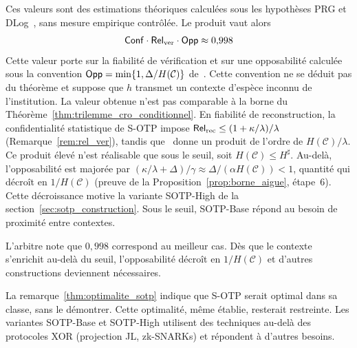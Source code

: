 \begin{sloppypar}
Ces valeurs sont des estimations th\'eoriques calcul\'ees sous les hypoth\`eses
PRG et DLog~\cite{Goldreich01,KatzLindell14}, sans mesure empirique
contr\^ol\'ee. Le produit vaut alors
\begin{equation}
\mathsf{Conf} \cdot \mathsf{Rel}_{\mathrm{ver}} \cdot \mathsf{Opp} \approx 0{,}998
\label{eq:sotp_produit}
\end{equation}
Cette valeur porte sur la fiabilit\'e de v\'erification et sur une
opposabilit\'e calcul\'ee sous la convention $\mathsf{Opp} = \min\{1,\Delta/H(\mathcal{C})\}$
de~\cite{MINKA2026CLO}. Cette convention ne se d\'eduit pas du th\'eor\`eme et suppose que $h$
transmet un contexte d'esp\`ece inconnu de l'institution. La valeur obtenue
n'est pas comparable \`a la borne du
Th\'eor\`eme~\ref{thm:trilemme_cro_conditionnel}. En fiabilit\'e de
reconstruction, la confidentialit\'e statistique de S-OTP impose
$\mathsf{Rel}_{\mathrm{rec}} \leq (1+\kappa/\lambda)/\lambda$ (Remarque~\ref{rem:rel_ver}),
tandis que~\cite{MINKA2026CLO} donne un produit de l'ordre de $H(\mathcal{C})/\lambda$.
Ce produit \'elev\'e n'est r\'ealisable que sous le seuil, soit $H(\mathcal{C}) \leq H^\sharp$.
Au-del\`a, l'opposabilit\'e
est major\'ee par $(\kappa/\lambda + \Delta)/\gamma \approx \Delta/(\alpha H(\mathcal{C})) < 1$, quantit\'e qui d\'ecro\^it en $1/H(\mathcal{C})$
(preuve de la Proposition~\ref{prop:borne_aigue}, \'etape~6). Cette d\'ecroissance motive
la variante SOTP-High de la section~\ref{sec:sotp_construction}. Sous le seuil, SOTP-Base r\'epond
au besoin de proximit\'e entre contextes.

\begin{boiteArbitre}
L'arbitre note que $0{,}998$ correspond au meilleur cas. D\`es que le
contexte s'enrichit au-del\`a du seuil, l'opposabilit\'e d\'ecro\^it en $1/H(\mathcal{C})$ et d'autres constructions
deviennent n\'ecessaires.
\end{boiteArbitre}

La remarque~\ref{thm:optimalite_sotp} indique que S-OTP serait optimal
dans sa classe, sans le d\'emontrer. Cette optimalit\'e, m\^eme \'etablie,
resterait restreinte. Les variantes SOTP-Base et SOTP-High utilisent
des techniques au-del\`a des protocoles XOR (projection JL, zk-SNARKs)
et r\'epondent \`a d'autres besoins.
\end{sloppypar}


